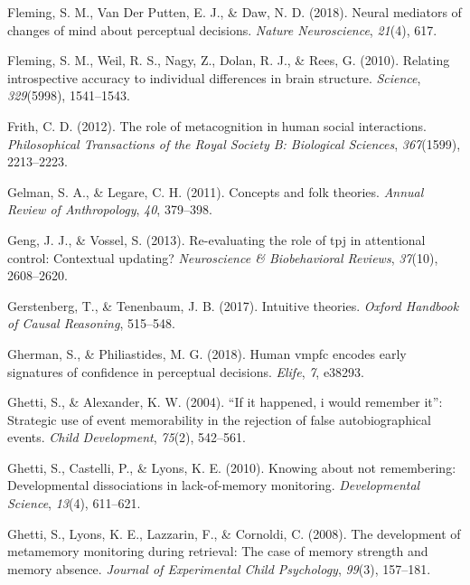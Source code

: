 \documentclass[12pt,twoside]{reedthesis}
\begin{document}
\leavevmode\hypertarget{ref-fleming2018neural}{}%
Fleming, S. M., Van Der Putten, E. J., \& Daw, N. D. (2018). Neural mediators of changes of mind about perceptual decisions. \emph{Nature Neuroscience}, \emph{21}(4), 617.

\leavevmode\hypertarget{ref-fleming2010relating}{}%
Fleming, S. M., Weil, R. S., Nagy, Z., Dolan, R. J., \& Rees, G. (2010). Relating introspective accuracy to individual differences in brain structure. \emph{Science}, \emph{329}(5998), 1541--1543.

\leavevmode\hypertarget{ref-frith2012role}{}%
Frith, C. D. (2012). The role of metacognition in human social interactions. \emph{Philosophical Transactions of the Royal Society B: Biological Sciences}, \emph{367}(1599), 2213--2223.

\leavevmode\hypertarget{ref-gelman2011concepts}{}%
Gelman, S. A., \& Legare, C. H. (2011). Concepts and folk theories. \emph{Annual Review of Anthropology}, \emph{40}, 379--398.

\leavevmode\hypertarget{ref-geng2013re}{}%
Geng, J. J., \& Vossel, S. (2013). Re-evaluating the role of tpj in attentional control: Contextual updating? \emph{Neuroscience \& Biobehavioral Reviews}, \emph{37}(10), 2608--2620.

\leavevmode\hypertarget{ref-gerstenberg2017intuitive}{}%
Gerstenberg, T., \& Tenenbaum, J. B. (2017). Intuitive theories. \emph{Oxford Handbook of Causal Reasoning}, 515--548.

\leavevmode\hypertarget{ref-gherman2018human}{}%
Gherman, S., \& Philiastides, M. G. (2018). Human vmpfc encodes early signatures of confidence in perceptual decisions. \emph{Elife}, \emph{7}, e38293.

\leavevmode\hypertarget{ref-ghetti2004if}{}%
Ghetti, S., \& Alexander, K. W. (2004). ``If it happened, i would remember it'': Strategic use of event memorability in the rejection of false autobiographical events. \emph{Child Development}, \emph{75}(2), 542--561.

\leavevmode\hypertarget{ref-ghetti2010knowing}{}%
Ghetti, S., Castelli, P., \& Lyons, K. E. (2010). Knowing about not remembering: Developmental dissociations in lack-of-memory monitoring. \emph{Developmental Science}, \emph{13}(4), 611--621.

\leavevmode\hypertarget{ref-ghetti2008development}{}%
Ghetti, S., Lyons, K. E., Lazzarin, F., \& Cornoldi, C. (2008). The development of metamemory monitoring during retrieval: The case of memory strength and memory absence. \emph{Journal of Experimental Child Psychology}, \emph{99}(3), 157--181.
\end{document}
